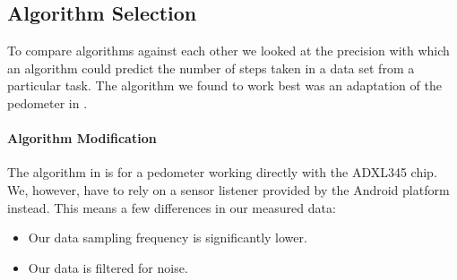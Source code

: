 \subsection{Algorithm Selection}
To compare algorithms against each other we looked at the precision with which an algorithm could predict the number of steps taken in a data set from a particular task. The algorithm we found to work best was an adaptation of the pedometer in \citet{zhao:pedometer}.

\paragraph{Algorithm Modification}
The algorithm in \citet{zhao:pedometer} is for a pedometer working directly with the ADXL345 chip. We, however, have to rely on a sensor listener provided by the Android platform instead. This means a few differences in our measured data:
\begin{itemize}
\item Our data sampling frequency is significantly lower. 
\item Our data is filtered for noise.
\end{itemize} 

